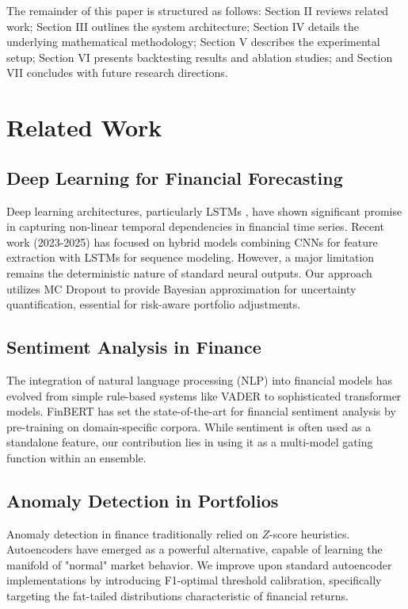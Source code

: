 \documentclass[conference]{IEEEtran}
\begin{document}
The remainder of this paper is structured as follows: Section II reviews 
related work; Section III outlines the system architecture; Section IV 
details the underlying mathematical methodology; Section V describes the 
experimental setup; Section VI presents backtesting results and ablation 
studies; and Section VII concludes with future research directions.

\section{Related Work}

\subsection{Deep Learning for Financial Forecasting}
Deep learning architectures, particularly LSTMs \cite{hochreiter1997}, 
have shown significant promise in capturing non-linear temporal 
dependencies in financial time series. Recent work (2023-2025) has 
focused on hybrid models combining CNNs for feature extraction with 
LSTMs for sequence modeling. However, a major limitation remains the 
deterministic nature of standard neural outputs. Our approach utilizes 
MC Dropout \cite{gal2016} to provide Bayesian approximation for 
uncertainty quantification, essential for risk-aware portfolio 
adjustments.

\subsection{Sentiment Analysis in Finance}
The integration of natural language processing (NLP) into financial 
models has evolved from simple rule-based systems like VADER to 
sophisticated transformer models. FinBERT \cite{finbert2019} has 
set the state-of-the-art for financial sentiment analysis by 
pre-training on domain-specific corpora. While sentiment is often 
used as a standalone feature, our contribution lies in using it 
as a multi-model gating function within an ensemble.

\subsection{Anomaly Detection in Portfolios}
Anomaly detection in finance traditionally relied on $Z$-score 
heuristics. Autoencoders have emerged as a powerful alternative, 
capable of learning the manifold of "normal" market behavior. We 
improve upon standard autoencoder implementations by introducing 
F1-optimal threshold calibration, specifically targeting the 
fat-tailed distributions characteristic of financial returns.
\end{document}
